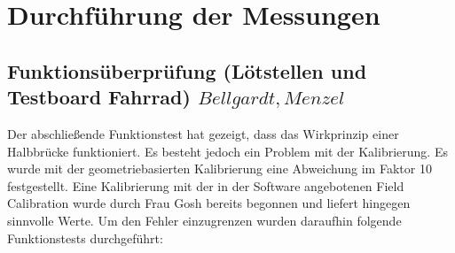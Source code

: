 \chapter{Durchf\"uhrung der Messungen}



\section{Funktions\"uberpr\"ufung (L\"otstellen und Testboard Fahrrad) \(Bellgardt, Menzel\)}
Der abschließende Funktionstest hat gezeigt, dass das Wirkprinzip einer Halbbrücke funktioniert. Es besteht jedoch ein Problem mit der Kalibrierung.
Es wurde mit der geometriebasierten Kalibrierung eine Abweichung im Faktor 10 festgestellt.
Eine Kalibrierung mit der in der Software angebotenen Field Calibration wurde durch Frau Gosh bereits begonnen und liefert hingegen sinnvolle Werte.
Um den Fehler einzugrenzen wurden daraufhin folgende Funktionstests durchgeführt:


